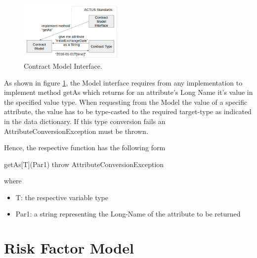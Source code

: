 \documentclass[9pt,oneside]{amsart}
\begin{document}
\begin{multicols}{2}

\begin{figure}[H]
	\centering
	\includegraphics[width=0.45\textwidth]{./media/model-interface.png}
	\caption{Contract Model Interface.}
	\label{fig:model-interface}
\end{figure}




As shown in figure \ref{fig:model-interface}, the Model interface requires from any implementation to implement method getAs  which returns for an attribute’s Long Name it’s value in the specified value type. When requesting from the Model the value of a specific attribute, the value has to be type-casted to the required target-type as indicated in the data dictionary. If this type conversion fails an AttributeConversionException must be thrown.

Hence, the respective function has the following form \par

getAs[T](Par1) throw AttributeConversionException \par

where

\begin{itemize}
	\item T: the respective variable type

	\item Par1: a string representing the Long-Name of the attribute to be returned
\end{itemize}




\section{Risk Factor Model}\label{rfmodel}


\end{multicols}
\end{document}
